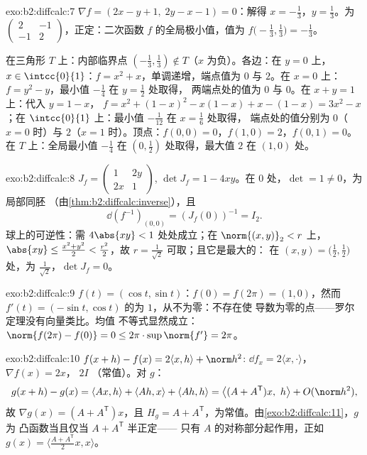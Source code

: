 \begin{solution}{exo:b2:diffcalc:7}
$\nabla f = (2x - y + 1,\; 2y - x - 1) = 0$：解得 $x =
-\frac13$，$y = \frac13$。为 $\begin{pmatrix} 2 & -1\\ -1 &
2\end{pmatrix}$，正定：二次函数
$f$ 的全局极小值，值为 $f\bigl(-\frac13, \frac13\bigr) = -\frac13$。

在三角形 $T$ 上：内部临界点 $(-\frac13,
\frac13) \notin T$（$x$ 为负）。各边：在 $y = 0$ 上，$x \in
\intcc{0}{1}$：$f = x^2 + x$，单调递增，端点值为 $0$ 与 $2$。在
$x = 0$ 上：$f = y^2 - y$，最小值 $-\frac14$ 在 $y = \frac12$ 处取得，
两端点处的值为 $0$ 与 $0$。在 $x + y = 1$ 上：代入 $y = 1 - x$，
$f = x^2 + (1-x)^2 - x(1-x) + x - (1-x) = 3x^2 - x$；在
$\intcc{0}{1}$ 上：最小值 $-\frac{1}{12}$ 在 $x = \frac16$ 处取得，
端点处的值分别为 $0$（$x=0$ 时）与 $2$（$x=1$ 时）。顶点：$f(0,0) = 0$，$f(1,0)
= 2$，$f(0,1) = 0$。在 $T$ 上：全局最小值 $-\frac14$ 在 $(0,
\frac12)$ 处取得，最大值 $2$ 在 $(1, 0)$ 处。
\end{solution}

\begin{solution}{exo:b2:diffcalc:8}
$J_f = \begin{pmatrix} 1 & 2y\\ 2x & 1\end{pmatrix}$, $\det J_f =
1 - 4xy$。在 $0$ 处，$\det = 1 \neq 0$，为局部同胚
（由\cref{thm:b2:diffcalc:inverse}），且
\[
\dd(f^{-1})_{(0,0)} = (J_f(0))^{-1} = I_2 .
\]
球上的可逆性：需 $4\abs{xy} < 1$ 处处成立；在
$\norm{(x,y)}_2 < r$ 上，$\abs{xy} \leq \frac{x^2 + y^2}{2} <
\frac{r^2}{2}$，故 $r = \frac{1}{\sqrt2}$ 可取；且它是最大的：
在 $(x, y) = \bigl(\tfrac12, \tfrac12\bigr)$ 处，为
$\frac{1}{\sqrt2}$，$\det J_f = 0$。
\end{solution}

\begin{solution}{exo:b2:diffcalc:9}
$f(t) = (\cos t, \sin t)$：$f(0) = f(2\pi) = (1, 0)$，然而 $f'(t) =
(-\sin t, \cos t)$ 的为 $1$，从不为零：不存在使
导数为零的点——罗尔定理没有向量类比。均值
不等式显然成立：$\norm{f(2\pi) - f(0)} = 0 \leq
2\pi \cdot \sup\norm{f'} = 2\pi$。
\end{solution}

\begin{solution}{exo:b2:diffcalc:10}
$f(x+h) - f(x) = 2\langle x, h\rangle + \norm h^2$: $\dd f_x =
2\langle x, \cdot\rangle$，$\nabla f(x) = 2x$， $2I$
（常值）。对 $g$：
\[
g(x + h) - g(x) = \langle Ax, h\rangle + \langle Ah, x\rangle
+ \langle Ah, h\rangle
= \bigl\langle (A + A^{\mathsf T})x,\ h\bigr\rangle +
O(\norm h^2),
\]
故 $\nabla g(x) = (A + A^{\mathsf T})x$，且 $H_g = A +
A^{\mathsf T}$，为常值。由\cref{exo:b2:diffcalc:11}，$g$ 为
凸函数当且仅当 $A + A^{\mathsf T}$ 半正定——
只有 $A$ 的对称部分起作用，正如 $g(x) =
\langle \frac{A + A^{\mathsf T}}2 x, x\rangle$。
\end{solution}

